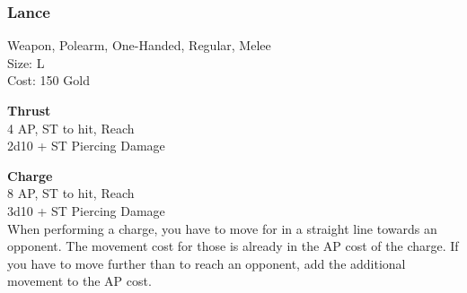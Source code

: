 \subsubsection{Lance}\label{weapon:lance}
Weapon, Polearm, One-Handed, Regular, Melee\\
Size: L\\
Cost: 150 Gold

\textbf{Thrust}\\
4 AP, ST to hit,  Reach\\
2d10 + \texttimes ST Piercing Damage

\textbf{Charge}\\
8 AP, ST to hit,  Reach\\
3d10 + \texttimes ST Piercing Damage\\
When performing a charge, you have to move for  in a straight line towards an opponent.
The movement cost for those  is already in the AP cost of the charge.
If you have to move further than  to reach an opponent, add the additional movement to the AP cost.